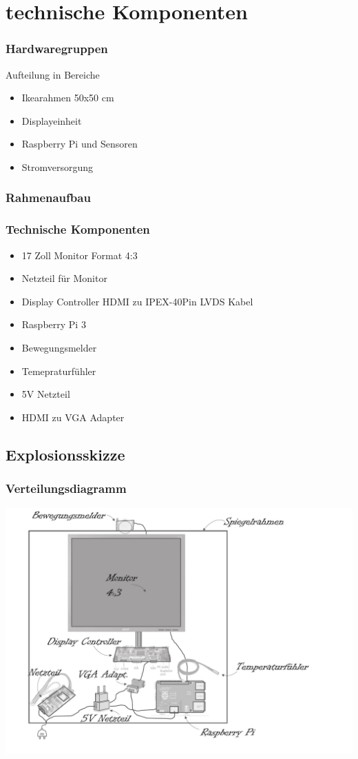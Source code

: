 \documentclass[11pt]{beamer}
\begin{document}
	\section{technische Komponenten}
	\begin{frame}
		\frametitle{Hardwaregruppen}
		\begin{center}
			\Large{Aufteilung in Bereiche}
		\end{center}
		\begin{itemize}
		\item Ikearahmen 50x50 cm
		\item Displayeinheit
		\item Raspberry Pi und Sensoren
		\item Stromversorgung
		\end{itemize}
	\end{frame}
	
	\begin{frame}
		\frametitle{Rahmenaufbau}
	\end{frame}		

	\begin{frame}
		\frametitle{Technische Komponenten}
		\begin{itemize}
		\item 17 Zoll Monitor Format 4:3
		\item Netzteil für Monitor
		\item Display Controller HDMI zu IPEX-40Pin LVDS Kabel 
		\item Raspberry Pi 3
		\item Bewegungsmelder
		\item Temepraturfühler
		\item 5V Netzteil
		\item HDMI zu VGA Adapter
		\end{itemize}
	\end{frame}

	\subsection{Explosionsskizze}
	\begin{frame}
		\frametitle{Verteilungsdiagramm}
		\includegraphics[scale = 0.4]{images/smartMirrorExplosionsskizze.pdf}
	\end{frame}
\end{document}
